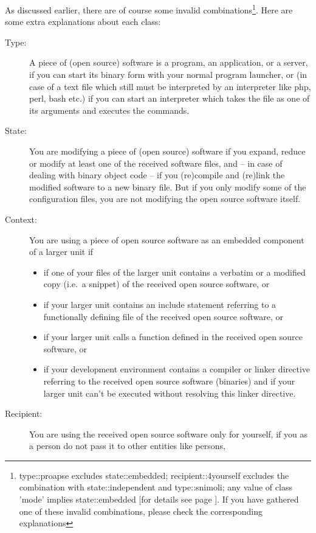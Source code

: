 
As discussed earlier, there are of course some invalid
combinations\footnote{type::proapse excludes state::embedded;
recipient::4yourself excludes the combination with state::independent and
type::snimoli; any value of class 'mode' implies state::embedded [for details
see page \pageref{InvalidFinderTokenCombinations}]. If you have gathered one of
these invalid combinations, please check the corresponding explanations}. Here
are some extra explanations about each class:

\begin{description}
\item[Type:] A piece of (open source) software is a program, an application, or
a server, if you can start its binary form with your normal program launcher, or
(in case of a text file which still must be interpreted by an interpreter like
php, perl, bash etc.) if you can start an interpreter which takes the file as
one of its arguments and executes the commands.
\item[State:] You are modifying a piece of (open source) software if you expand,
reduce or modify at least one of the received software files, and -- in case of
dealing with binary object code -- if you (re)compile and (re)link the modified
software to a new binary file. But if you only modify some of the configuration
files, you are not modifying the open source software itself.
\item[Context:] You are using a piece of open source software as an embedded
component of a larger unit if
  \begin{itemize}
  \item  if one of your files of the larger unit contains a verbatim or a
  modified copy (i.e.\ a snippet) of the received open source software, or
  \item if your larger unit contains an include statement referring to a
  functionally defining file of the received open source software, or
  \item if your larger unit calls a function defined in the received open source
  software, or
  \item if your development environment contains a compiler or linker directive
  referring to the received open source software (binaries) and if your larger
  unit can't be executed without resolving this linker directive.
  \end{itemize}
\item[Recipient:] You are using the received open source software only for
yourself, if you as a person do not pass it to other entities like persons,

\end{description}
